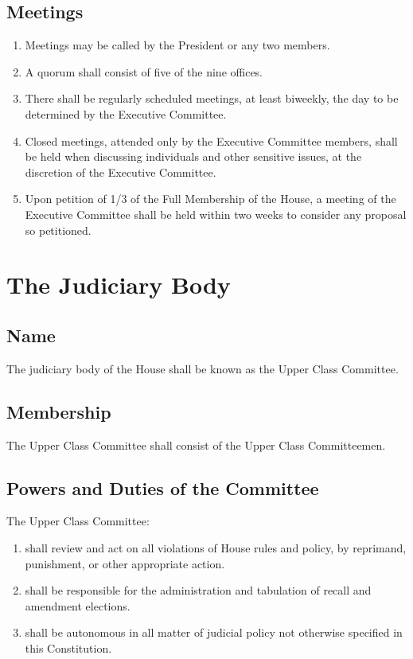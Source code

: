 \documentclass[10pt]{article} %
\begin{document}
\subsection{Meetings}
\begin{enumerate}
\item Meetings may be called by the President or any two members.
\item A quorum shall consist of five of the nine offices.
\item There shall be regularly scheduled meetings, at least biweekly, the day to be determined by the Executive Committee.
\item Closed meetings, attended only by the Executive Committee members, shall be held when discussing individuals and other sensitive issues, at the discretion of the Executive Committee.
\item Upon petition of 1/3 of the Full Membership of the House, a meeting of the Executive Committee shall be held within two weeks to consider any proposal so petitioned.
\end{enumerate}
\section{The Judiciary Body}
\subsection{Name}
The judiciary body of the House shall be known as the Upper Class Committee.
\subsection{Membership}
The Upper Class Committee shall consist of the Upper Class Committeemen.
\subsection{Powers and Duties of the Committee}
The Upper Class Committee:
\begin{enumerate}
\item shall review and act on all violations of House rules and policy, by reprimand, punishment, or other appropriate action.
\item shall be responsible for the administration and tabulation of recall and amendment elections.
\item shall be autonomous in all matter of judicial policy not otherwise specified in this Constitution.
\end{enumerate}
\end{document}

